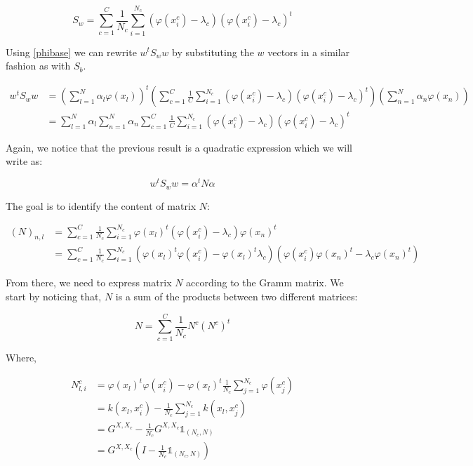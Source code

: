 \begin{equation*}
S_w = \sum_{c = 1}^C \frac{1}{N_c} \sum_{i = 1}^{N_c} (\varphi(x_i^c) - \lambda_c)(\varphi(x_i^c) -
\lambda_c)^t
\end{equation*}

Using \ref{phibase} we can rewrite $w^tS_ww$ by substituting the $w$ vectors in a similar fashion as
with $S_b$.

\begin{align*}
  w^tS_ww &= \left( \sum_{l=1}^N \alpha_l \varphi(x_l)\right)^t
             \left( \sum_{c=1}^C \frac{1}{C}
                       \sum_{i=1}^{N_c} (\varphi(x_i^c) - \lambda_c)
                                        (\varphi(x_i^c) - \lambda_c)^t\right)
             \left( \sum_{n=1}^N \alpha_n \varphi(x_n)\right)\\
          &= \sum_{l=1}^N \alpha_l \sum_{n=1}^N \alpha_n \sum_{c=1}^C \frac{1}{C}
                \sum_{i=1}^{N_c} (\varphi(x_i^c) - \lambda_c)
                                 (\varphi(x_i^c) - \lambda_c)^t
\end{align*}

Again, we notice that the previous result is a quadratic expression which we will write as:

\begin{equation*}
w^tS_ww = \alpha^tN\alpha
\end{equation*}

The goal is to identify the content of matrix $N$:

\begin{align*}
  (N)_{n,l} &= \sum_{c=1}^C \frac{1}{N_c} \sum_{i=1}^{N_c}
                  \varphi(x_l)^t(\varphi(x_i^c) - \lambda_c)\varphi(x_n)^t \\
            &= \sum_{c=1}^C \frac{1}{N_c} \sum_{i=1}^{N_c} (\varphi(x_l)^t\varphi(x_i^c) -
            \varphi(x_l)^t\lambda_c) (\varphi(x_i^c)\varphi(x_n)^t -
            \lambda_c \varphi(x_n)^t)
\end{align*}

From there, we need to express matrix $N$ according to the Gramm matrix. We start by noticing that,
$N$ is a sum of the products between two different matrices:

\begin{equation*}
N = \sum_{c=1}^C \frac{1}{N_c} N^c (N^c)^t
\end{equation*}

Where,

\begin{align*}
  N^c_{l, i} &= \varphi(x_l)^t\varphi(x_i^c) - \varphi(x_l)^t \frac{1}{N_c}\sum_{j=1}^{N_c}\varphi(x_j^c) \\
             &= k(x_l, x_i^c) - \frac{1}{N_c}\sum_{j=1}^{N_c}k(x_l, x_j^c) \\
             &= G^{X, X_c} - \frac{1}{N_c} G^{X, X_c} \mathds{1}_{(N_c, N)} \\
             &= G^{X, X_c} (I - \frac{1}{N_c}\mathds{1}_{(N_c, N)})
\end{align*}

